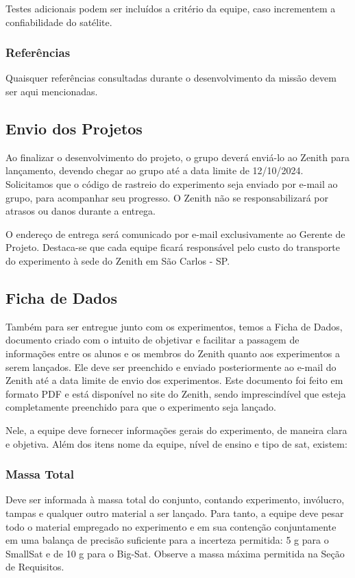             Testes adicionais podem ser incluídos a critério da equipe, caso incrementem a confiabilidade do satélite.

        \subsubsection{Referências}
            Quaisquer referências consultadas durante o desenvolvimento da missão devem ser aqui mencionadas.

    \subsection{Envio dos Projetos}
        Ao finalizar o desenvolvimento do projeto, o grupo deverá enviá-lo ao Zenith para lançamento, devendo chegar ao grupo até a data limite de 12/10/2024. Solicitamos que o código de rastreio do experimento seja enviado por e-mail ao grupo, para acompanhar seu progresso. O Zenith não se responsabilizará por atrasos ou danos durante a entrega.
        
        O endereço de entrega será comunicado por e-mail exclusivamente ao Gerente de Projeto. Destaca-se que cada equipe ficará responsável pelo custo do transporte do experimento à sede do Zenith em São Carlos - SP.
    
    \subsection{Ficha de Dados}
        Também para ser entregue junto com os experimentos, temos a Ficha de Dados, documento criado com o intuito de objetivar e facilitar a passagem de informações entre os alunos e os membros do Zenith quanto aos experimentos a serem lançados. Ele deve ser preenchido e enviado posteriormente ao e-mail do Zenith até a data limite de envio dos experimentos. Este documento foi feito em formato PDF e está disponível no site do Zenith, sendo imprescindível que esteja completamente preenchido para que o experimento seja lançado.
        
        Nele, a equipe deve fornecer informações gerais do experimento, de maneira clara e objetiva. Além dos itens nome da equipe, nível de ensino e tipo de sat, existem:

        \subsubsection{Massa Total}
            Deve ser informada à massa total do conjunto, contando experimento, invólucro, tampas e qualquer outro material a ser lançado. Para tanto, a equipe deve pesar todo o material empregado no experimento e em sua contenção conjuntamente em uma balança de precisão suficiente para a incerteza permitida: 5 g para o SmallSat e de 10 g para o Big-Sat. Observe a massa máxima permitida na Seção de Requisitos.
            
